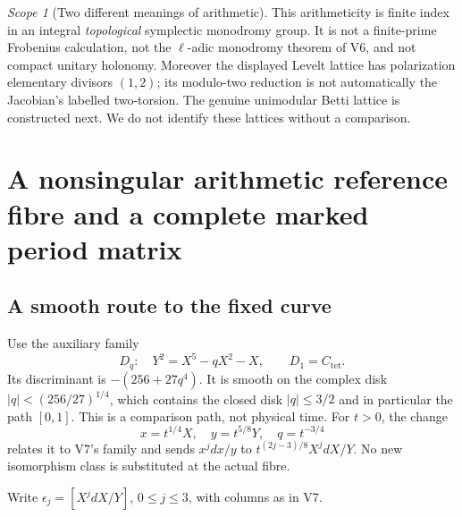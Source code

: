 \documentclass[11pt]{article}
\theoremstyle{definition}
\theoremstyle{remark}
\newtheorem{scope}[scope]{Scope}
\begin{document}
\begin{scope}[Two different meanings of arithmetic]
This arithmeticity is finite index in an integral \emph{topological}
symplectic monodromy group. It is not a finite-prime Frobenius calculation,
not the $\ell$-adic monodromy theorem of V6, and not compact unitary
holonomy. Moreover the displayed Levelt lattice has polarization elementary
divisors $(1,2)$; its modulo-two reduction is not automatically the
Jacobian's labelled two-torsion. The genuine unimodular Betti lattice is
constructed next. We do not identify these lattices without a comparison.
\end{scope}

\section{A nonsingular arithmetic reference fibre and a complete marked period matrix}
\label{sec:v8-periods}

\subsection{A smooth route to the fixed curve}
Use the auxiliary family
\begin{equation}
 D_q:\quad Y^2=X^5-qX^2-X,\qquad D_1=C_{\mathrm{tet}}.
 \label{eq:v8-Dq}
\end{equation}
Its discriminant is $-(256+27q^4)$. It is smooth on the complex disk
$|q|<(256/27)^{1/4}$, which contains the closed disk $|q|\le3/2$ and
in particular the path $[0,1]$. This is a comparison path, not physical
time. For $t>0$, the change
\[
 x=t^{1/4}X,\quad y=t^{5/8}Y,\quad q=t^{-3/4}
\]
relates it to V7's family and sends $x^jdx/y$ to
$t^{(2j-3)/8}X^j dX/Y$. No new isomorphism class is substituted at the
actual fibre.

Write $\epsilon_j=[X^j dX/Y]$, $0\le j\le3$, with columns as in V7.
\end{document}
